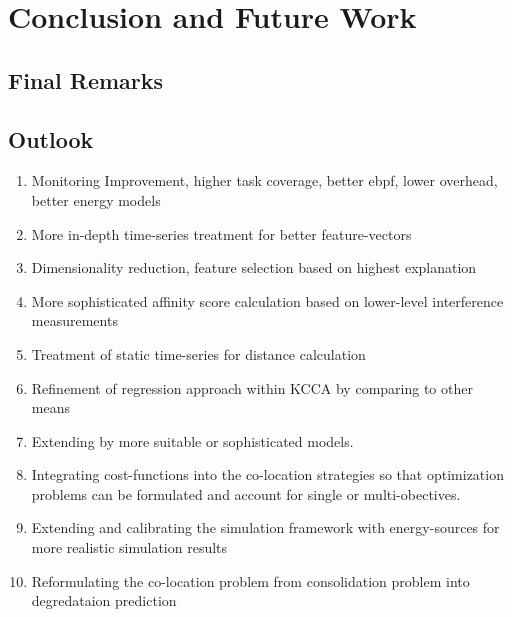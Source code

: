 \section{Conclusion and Future Work}
\label{cha:conclusionfuturework}

\subsection{Final Remarks}
\label{sec:final_remarks}

\subsection{Outlook}
\label{sec:outlook}

\begin{enumerate}
    \item Monitoring Improvement, higher task coverage, better ebpf, lower overhead, better energy models
    \item More in-depth time-series treatment for better feature-vectors
    \item Dimensionality reduction, feature selection based on highest explanation
    \item More sophisticated affinity score calculation based on lower-level interference measurements
    \item Treatment of static time-series for distance calculation
    \item Refinement of regression approach within KCCA by comparing to other means
    \item Extending by more suitable or sophisticated models.
    \item Integrating cost-functions into the co-location strategies so that optimization problems can be formulated and account for single or multi-obectives.
    \item Extending and calibrating the simulation framework with energy-sources for more realistic simulation results
    \item Reformulating the co-location problem from consolidation problem into degredataion prediction

\end{enumerate}